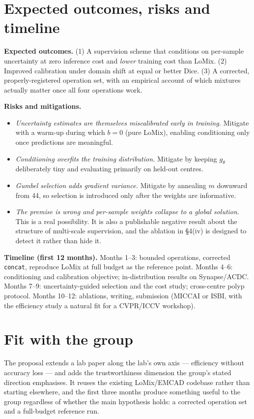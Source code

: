 \documentclass[11pt,a4paper]{article}
\newcommand{\code}[1]{\texttt{\small #1}}
\begin{document}
\section{Expected outcomes, risks and timeline}

\textbf{Expected outcomes.} (1) A supervision scheme that conditions on
per-sample uncertainty at zero inference cost and \emph{lower} training cost
than LoMix. (2) Improved calibration under domain shift at equal or better Dice.
(3) A corrected, properly-registered operation set, with an empirical account of
which mixtures actually matter once all four operations work.

\textbf{Risks and mitigations.}
\begin{itemize}
\item \emph{Uncertainty estimates are themselves miscalibrated early in
training.} Mitigate with a warm-up during which $b = 0$ (pure LoMix), enabling
conditioning only once predictions are meaningful.
\item \emph{Conditioning overfits the training distribution.} Mitigate by
keeping $g_\theta$ deliberately tiny and evaluating primarily on held-out
centres.
\item \emph{Gumbel selection adds gradient variance.} Mitigate by annealing $m$
downward from 44, so selection is introduced only after the weights are
informative.
\item \emph{The premise is wrong and per-sample weights collapse to a global
solution.} This is a real possibility. It is also a publishable negative result
about the structure of multi-scale supervision, and the ablation in \S4(iv) is
designed to detect it rather than hide it.
\end{itemize}

\textbf{Timeline (first 12 months).} Months 1--3: bounded operations, corrected
\code{concat}, reproduce LoMix at full budget as the reference point. Months
4--6: conditioning and calibration objective; in-distribution results on
Synapse/ACDC. Months 7--9: uncertainty-guided selection and the cost study;
cross-centre polyp protocol. Months 10--12: ablations, writing, submission
(MICCAI or ISBI, with the efficiency study a natural fit for a CVPR/ICCV
workshop).

\section{Fit with the group}

The proposal extends a lab paper along the lab's own axis --- efficiency without
accuracy loss --- and adds the trustworthiness dimension the group's stated
direction emphasises. It reuses the existing LoMix/EMCAD codebase rather than
starting elsewhere, and the first three months produce something useful to the
group regardless of whether the main hypothesis holds: a corrected operation set
and a full-budget reference run.
\end{document}
